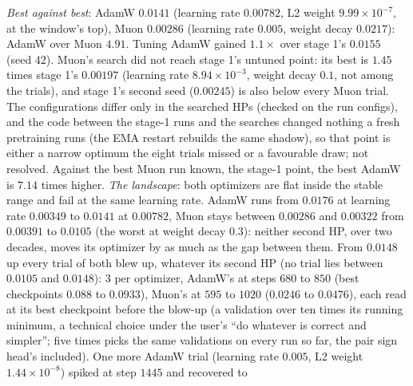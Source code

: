 \documentclass[11pt]{article}
\begin{document}
\begin{itemize}
    \emph{Best against best}: AdamW $0.0141$ (learning rate $0.00782$, L2 weight $9.99\times10^{-7}$, at the window's
    top), Muon $0.00286$ (learning rate $0.005$, weight decay $0.0217$): AdamW over Muon $4.91$. Tuning AdamW gained
    $1.1\times$ over stage 1's $0.0155$ (seed 42). Muon's search did not reach stage 1's untuned point: its best is
    $1.45$ times stage 1's $0.00197$ (learning rate $8.94\times10^{-3}$, weight decay $0.1$, not among the trials), and
    stage 1's second seed ($0.00245$) is also below every Muon trial. The configurations differ only in the searched
    HPs (checked on the run configs), and the code between the stage-1 runs and the searches changed nothing a fresh
    pretraining runs (the EMA restart rebuilds the same shadow), so that point is either a narrow optimum the eight
    trials missed or a favourable draw; not resolved. Against the best Muon run known, the stage-1 point, the best
    AdamW is $7.14$ times higher. \emph{The landscape}: both optimizers are flat inside the stable range and fail at
    the same learning rate. AdamW runs from $0.0176$ at learning rate $0.00349$ to $0.0141$ at $0.00782$, Muon stays
    between $0.00286$ and $0.00322$ from $0.00391$ to $0.0105$ (the worst at weight decay $0.3$): neither second HP,
    over two decades, moves its optimizer by as much as the gap between them. From $0.0148$ up every trial of both
    blew up, whatever its second HP (no trial lies between $0.0105$ and $0.0148$): $3$ per optimizer, AdamW's at
    steps $680$ to $850$ (best checkpoints $0.088$ to $0.0933$), Muon's at $595$ to $1020$ ($0.0246$ to $0.0476$),
    each read at its best checkpoint before the blow-up (a validation over ten times its running minimum, a technical
    choice under the user's ``do whatever is correct and simpler''; five times picks the same validations on every run
    so far, the pair sign head's included). One more
    AdamW trial (learning rate $0.005$, L2 weight $1.44\times10^{-8}$) spiked at step $1445$ and recovered to

\end{itemize}
\end{document}

